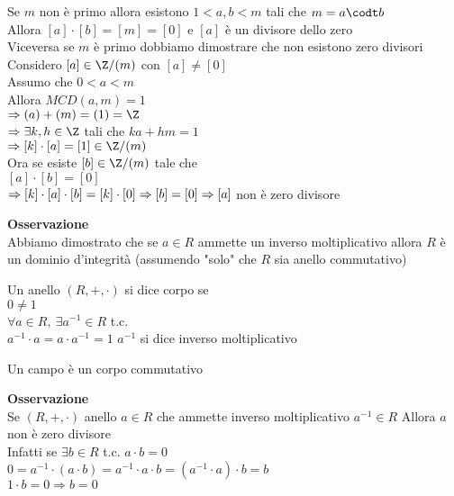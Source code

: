 \documentclass[12px]{article}
\begin{document}
\begin{dimo}
	Se $m$ non è primo allora esistono $1<a,b < m$ tali che $m = a\codt b$\\
	Allora  $[a]\cdot[b] = [m] = [0]$ e  $[a]$ è un divisore dello zero\\
	Viceversa se $m$ è primo dobbiamo dimostrare che non esistono zero divisori \\
	Considero $[a]\in\Z/(m)$ con $[a]\neq [0]$\\
	Assumo che  $0< a < m$ \\
	Allora $MCD(a,m) = 1$\\
	$ \Rightarrow (a) + (m) = (1) =\Z$ \\
	$ \Rightarrow \exists k,h\in \Z$ tali che $ka + hm = 1$\\
	$ \Rightarrow [k]\cdot [a] = [1]\in \Z/(m)$\\
	Ora se esiste $[b]\in \Z/(m)$ tale che\\
	$[a]\cdot[b] = [0]$\\
	$ \Rightarrow [k]\cdot[a]\cdot[b] = [k]\cdot [0]\\
	\Rightarrow [b] = [0]\\
	\Rightarrow  [a]$  non è zero divisore
\end{dimo}
\textbf{Osservazione}\\
Abbiamo dimostrato che se $a\in R$ ammette un inverso moltiplicativo allora  $R$ è un dominio d'integrità (assumendo "solo" che $R$ sia anello commutativo)\\
\begin{defi}
	Un anello $(R,+, \cdot)$ si dice corpo se\\
	 $0\neq 1$\\
	 $\forall a\in R, \ \exists a^{-1}\in R$ t.c.\\
	 $a^{-1} \cdot a = a\cdot a^{-1} = 1$ 
	 $a^{-1}$ si dice inverso moltiplicativo
\end{defi}
\begin{defi}
	Un campo è un corpo commutativo
\end{defi}
\textbf{Osservazione}\\
Se $(R, +,\cdot)$ anello $a\in R$ che ammette inverso moltiplicativo  $a^{-1}\in R $ Allora $a$ non è zero divisore\\
Infatti se $\exists b \in R$ t.c.  $a\cdot b = 0$ \\
$0 = a^{-1}\cdot (a\cdot b) = a^{-1}\cdot a\cdot b = (a^{-1}\cdot a) \cdot b = b$\\
$1\cdot b = 0 \Rightarrow  b = 0$ \\
\end{document}
